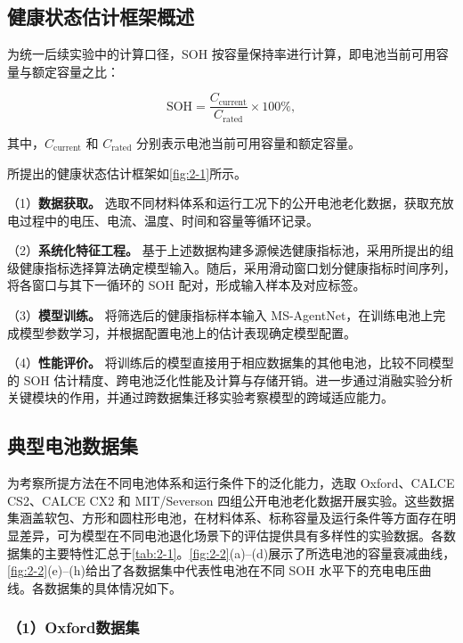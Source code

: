 \subsection{健康状态估计框架概述}

为统一后续实验中的计算口径，SOH 按容量保持率进行计算，即电池当前可用容量与额定容量之比\cite{ref13,ref14}：

\begin{equation}
\mathrm{SOH}=\frac{C_{\mathrm{current}}}{C_{\mathrm{rated}}}\times100\%,
\end{equation}

其中，$C_{\mathrm{current}}$ 和 $C_{\mathrm{rated}}$ 分别表示电池当前可用容量和额定容量。

所提出的健康状态估计框架如\cref{fig:2-1}所示。

（1）\textbf{数据获取。} 选取不同材料体系和运行工况下的公开电池老化数据，获取充放电过程中的电压、电流、温度、时间和容量等循环记录。

（2）\textbf{系统化特征工程。} 基于上述数据构建多源候选健康指标池，采用所提出的组级健康指标选择算法确定模型输入。随后，采用滑动窗口划分健康指标时间序列，将各窗口与其下一循环的 SOH 配对，形成输入样本及对应标签。

（3）\textbf{模型训练。} 将筛选后的健康指标样本输入 MS-AgentNet，在训练电池上完成模型参数学习，并根据配置电池上的估计表现确定模型配置。

（4）\textbf{性能评价。} 将训练后的模型直接用于相应数据集的其他电池，比较不同模型的 SOH 估计精度、跨电池泛化性能及计算与存储开销。进一步通过消融实验分析关键模块的作用，并通过跨数据集迁移实验考察模型的跨域适应能力。

\subsection{典型电池数据集}

为考察所提方法在不同电池体系和运行条件下的泛化能力，选取 Oxford、CALCE CS2、CALCE CX2 和 MIT/Severson 四组公开电池老化数据开展实验。这些数据集涵盖软包、方形和圆柱形电池，在材料体系、标称容量及运行条件等方面存在明显差异，可为模型在不同电池退化场景下的评估提供具有多样性的实验数据。各数据集的主要特性汇总于\cref{tab:2-1}。\cref{fig:2-2}(a)--(d)展示了所选电池的容量衰减曲线，\cref{fig:2-2}(e)--(h)给出了各数据集中代表性电池在不同 SOH 水平下的充电电压曲线。各数据集的具体情况如下。



\subsubsection*{（1）Oxford数据集}

